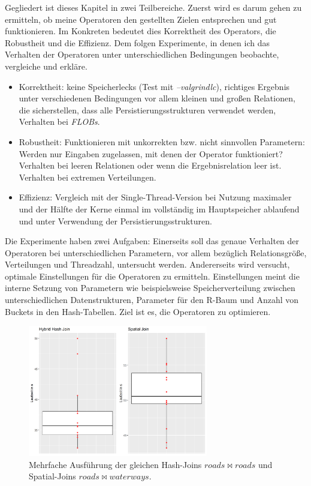 \documentclass[a4paper,12pt,twoside]{article}
\newcommand{\Fb}[1]{\textit{#1}} %
\begin{document}
Gegliedert ist dieses Kapitel in zwei Teilbereiche. Zuerst wird es darum gehen zu ermitteln, ob meine Operatoren den gestellten Zielen entsprechen und gut funktionieren. Im Konkreten bedeutet dies Korrektheit des Operators, die Robustheit und die Effizienz. Dem folgen Experimente, in denen ich das Verhalten der Operatoren unter unterschiedlichen Bedingungen beobachte, vergleiche und erkläre. 

\begin{itemize}
	\item Korrektheit: keine Speicherlecks (Test mit \Fb{--valgrindlc}), richtiges Ergebnis unter verschiedenen Bedingungen vor allem kleinen und großen Relationen, die sicherstellen, dass alle Persistierungsstrukturen verwendet werden, Verhalten bei \Fb{FLOBs}.
	\item Robustheit: Funktionieren mit unkorrekten bzw. nicht sinnvollen Parametern: Werden nur Eingaben zugelassen, mit denen der Operator funktioniert? Verhalten bei leeren Relationen oder wenn die Ergebnisrelation leer ist. Verhalten bei extremen Verteilungen.
	\item Effizienz: Vergleich mit der Single-Thread-Version bei Nutzung maximaler und der Hälfte der Kerne einmal im vollständig im Hauptspeicher ablaufend und unter Verwendung der Persistierungsstrukturen. 
\end{itemize}

Die Experimente haben zwei Aufgaben: Einerseits soll das genaue Verhalten der Operatoren bei unterschiedlichen Parametern, vor allem bezüglich Relationsgröße, Verteilungen und Threadzahl, untersucht werden. Andererseits wird versucht, optimale Einstellungen für die Operatoren zu ermitteln. Einstellungen meint die interne Setzung von Parametern wie beispielsweise Speicherverteilung zwischen unterschiedlichen Datenstrukturen, Parameter für den R-Baum und Anzahl von Buckets in den Hash-Tabellen. Ziel ist es, die Operatoren zu optimieren.

\begin{figure}
	\centering
	\includegraphics[width=0.70\textwidth]{Bilder/streuung.png}
	\caption{Mehrfache Ausführung der gleichen Hash-Joins $roads \bowtie roads$ und Spatial-Joins $roads \bowtie waterways$.}
	\label{img:streuung}
\end{figure}
\end{document}
